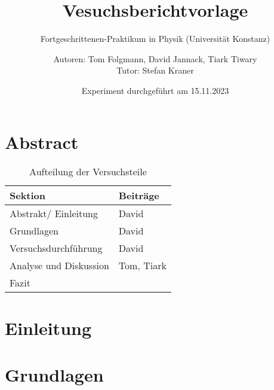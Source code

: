 \documentclass[
    oneside, 
    footinclude=off, 
    captions=tableheading, 
    DIV=12;usenames,
    dvipsnames
]{scrartcl}
\begin{document}
    \title{Vesuchsberichtvorlage}
    \subtitle{Fortgeschrittenen-Praktikum in Physik (Universität Konstanz)}
    \author{Autoren: Tom Folgmann, David Jannack, Tiark Tiwary \\ \large{Tutor: Stefan Kraner}}
    \date{Experiment durchgeführt am 15.11.2023}
    \maketitle
    \thispagestyle{empty}
    \section*{Abstract}
        

    \begin{table}[H]
        \centering
        \begin{tabular}{ll}
             Sektion & Beiträge \\\hline\hline
             Abstrakt/ Einleitung & David \\
             Grundlagen & David \\
             Versuchsdurchführung & David \\
             Analyse und Diskussion & Tom, Tiark \\
             Fazit & 
        \end{tabular}
        \caption{Aufteilung der Versuchsteile}
        \label{tab:Aufteilung}
    \end{table}

    \newpage


    \tableofcontents
    \thispagestyle{empty}	
    \newpage
    \setcounter{page}{1}


\newpage
\section{Einleitung}
        

\newpage
\section{Grundlagen}
    
\end{document}
